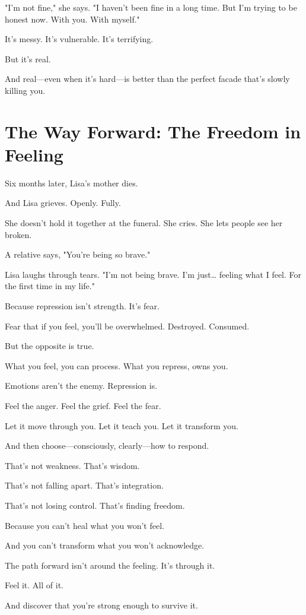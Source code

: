 \documentclass[11pt,twoside]{book}
\begin{document}
"I'm not fine," she says. "I haven't been fine in a long time. But I'm trying to be honest now. With you. With myself."

It's messy. It's vulnerable. It's terrifying.

But it's real.

And real—even when it's hard—is better than the perfect facade that's slowly killing you.

\section*{The Way Forward: The Freedom in Feeling}

Six months later, Lisa's mother dies.

And Lisa grieves. Openly. Fully.

She doesn't hold it together at the funeral. She cries. She lets people see her broken.

A relative says, "You're being so brave."

Lisa laughs through tears. "I'm not being brave. I'm just\ldots{} feeling what I feel. For the first time in my life."

Because repression isn't strength. It's fear.

Fear that if you feel, you'll be overwhelmed. Destroyed. Consumed.

But the opposite is true.

What you feel, you can process. What you repress, owns you.

Emotions aren't the enemy. Repression is.

Feel the anger. Feel the grief. Feel the fear.

Let it move through you. Let it teach you. Let it transform you.

And then choose—consciously, clearly—how to respond.

That's not weakness. That's wisdom.

That's not falling apart. That's integration.

That's not losing control. That's finding freedom.

Because you can't heal what you won't feel.

And you can't transform what you won't acknowledge.

The path forward isn't around the feeling. It's through it.

Feel it. All of it.

And discover that you're strong enough to survive it.
\end{document}
